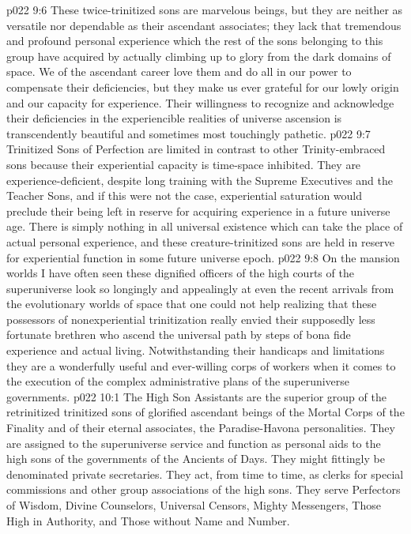 \vs p022 9:6 These twice\hyp{}trinitized sons are marvelous beings, but they are neither as versatile nor dependable as their ascendant associates; they lack that tremendous and profound personal experience which the rest of the sons belonging to this group have acquired by actually climbing up to glory from the dark domains of space. We of the ascendant career love them and do all in our power to compensate their deficiencies, but they make us ever grateful for our lowly origin and our capacity for experience. Their willingness to recognize and acknowledge their deficiencies in the experiencible realities of universe ascension is transcendently beautiful and sometimes most touchingly pathetic.
\vs p022 9:7 Trinitized Sons of Perfection are limited in contrast to other Trinity\hyp{}embraced sons because their experiential capacity is time\hyp{}space inhibited. They are experience\hyp{}deficient, despite long training with the Supreme Executives and the Teacher Sons, and if this were not the case, experiential saturation would preclude their being left in reserve for acquiring experience in a future universe age. There is simply nothing in all universal existence which can take the place of actual personal experience, and these creature\hyp{}trinitized sons are held in reserve for experiential function in some future universe epoch.
\vs p022 9:8 On the mansion worlds I have often seen these dignified officers of the high courts of the superuniverse look so longingly and appealingly at even the recent arrivals from the evolutionary worlds of space that one could not help realizing that these possessors of nonexperiential trinitization really envied their supposedly less fortunate brethren who ascend the universal path by steps of bona fide experience and actual living. Notwithstanding their handicaps and limitations they are a wonderfully useful and ever\hyp{}willing corps of workers when it comes to the execution of the complex administrative plans of the superuniverse governments.
\vs p022 10:1 The High Son Assistants are the superior group of the retrinitized trinitized sons of glorified ascendant beings of the Mortal Corps of the Finality and of their eternal associates, the Paradise\hyp{}Havona personalities. They are assigned to the superuniverse service and function as personal aids to the high sons of the governments of the Ancients of Days. They might fittingly be denominated private secretaries. They act, from time to time, as clerks for special commissions and other group associations of the high sons. They serve Perfectors of Wisdom, Divine Counselors, Universal Censors, Mighty Messengers, Those High in Authority, and Those without Name and Number.
